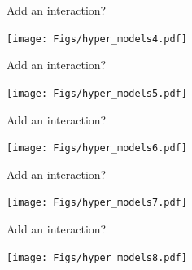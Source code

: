 \documentclass[12pt]{article}
\newcommand{\headsize}{\fontsize{35}{35} \selectfont}
\begin{document}
\newpage


\headsize \color{myyellow}
\hfill \begin{minipage}{5.75in}
\centering
Add an interaction?
\end{minipage}

\vfill


\centerline{\texttt{[image: Figs/hyper\_models4.pdf]}}



\newpage

\addtocounter{page}{-1}

\headsize \color{myyellow}
\hfill \begin{minipage}{5.75in}
\centering
Add an interaction?
\end{minipage}

\vfill


\centerline{\texttt{[image: Figs/hyper\_models5.pdf]}}



\newpage

\addtocounter{page}{-1}

\headsize \color{myyellow}
\hfill \begin{minipage}{5.75in}
\centering
Add an interaction?
\end{minipage}

\vfill


\centerline{\texttt{[image: Figs/hyper\_models6.pdf]}}



\newpage

\addtocounter{page}{-1}

\headsize \color{myyellow}
\hfill \begin{minipage}{5.75in}
\centering
Add an interaction?
\end{minipage}

\vfill


\centerline{\texttt{[image: Figs/hyper\_models7.pdf]}}



\newpage

\addtocounter{page}{-1}

\headsize \color{myyellow}
\hfill \begin{minipage}{5.75in}
\centering
Add an interaction?
\end{minipage}

\vfill


\centerline{\texttt{[image: Figs/hyper\_models8.pdf]}}




\newpage
\end{document}

